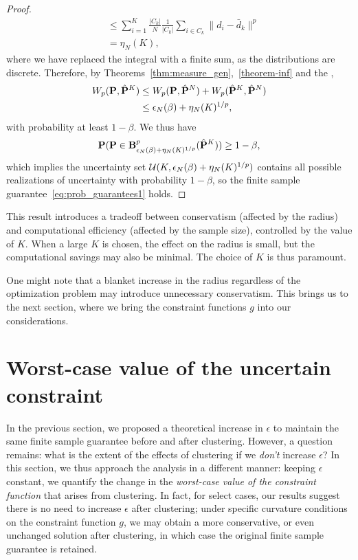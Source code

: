 {\begin{proof}
\begin{equation*}
\begin{aligned}
&\leq \sum_{i = 1}^K \frac{|C_k|}{N}  \frac{1}{|C_k|} \sum_{i \in C_k} \|d_i - \bar{d}_k\|^p\\
&= \eta_N(K),
	\end{aligned}
	\end{equation*}
where we have replaced the integral with a finite sum, as the distributions are discrete. Therefore, by Theorems~\ref{thm:measure_gen},~\ref{theorem-inf} and the ,
\begin{equation*}
	\begin{aligned}
	W_p({\mathbf P},\hat{{\mathbf P}}^K) &\leq W_p({\mathbf P},\hat{{\mathbf P}}^N) + W_p(\hat{{\mathbf P}}^K,\hat{{\mathbf P}}^N)\\
	&\leq \epsilon_N(\beta) + \eta_N(K)^{1/p},
\end{aligned}
	\end{equation*}
with probability at least $1 - \beta$. We thus have
\begin{equation*}
		{\mathbf P}({\mathbf P} \in \mathbf{B}_{\epsilon_N(\beta) + \eta_N(K)^{1/p}}^p (\hat{{\mathbf P}}^K) )\geq 1 - \beta,
	\end{equation*}
which implies the uncertainty set ${\mathcal{U}}(K, \epsilon_N(\beta) + \eta_N(K)^{1/p})$ contains all possible realizations of uncertainty with probability $1-\beta$, so the finite sample guarantee~\eqref{eq:prob_guarantees1} holds.
\end{proof}

This result introduces a tradeoff between conservatism (affected by the radius) and computational efficiency (affected by the sample size), controlled by the value of $K$. When a large $K$ is chosen, the effect on the radius is small, but the computational savings may also be minimal. The choice of $K$ is thus paramount.

One might note that a blanket increase in the radius regardless of the optimization problem may introduce unnecessary conservatism. This brings us to the next section, where we bring the constraint functions $g$ into our considerations. 


\section{Worst-case value of the uncertain constraint}
\label{sec:conservatism}
In the previous section, we proposed a theoretical increase in $\epsilon$ to maintain the same finite sample guarantee before and after clustering. 
However, a question remains: what is the extent of the effects of clustering if we {\it don't} increase $\epsilon$?
In this section, we thus approach the analysis in a different manner: keeping $\epsilon$ constant, we quantify the change in the {\it worst-case value of the constraint function} that arises from clustering. 
In fact, for select cases, our results suggest there is no need to increase $\epsilon$ after clustering; under specific curvature conditions on the  constraint function $g$, we may obtain a more conservative, or even unchanged solution after clustering, in which case the original finite sample guarantee is retained. 

}
